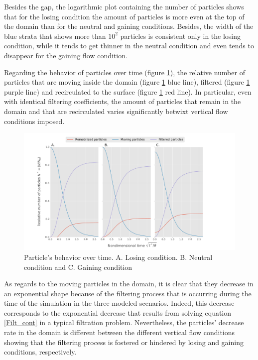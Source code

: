 \documentclass[draft,linenumbers]{agujournal2018}
\begin{document}
Besides the gap, the logarithmic plot containing the number of particles shows that for the losing condition the amount of particles is more even at the top of the domain than for the neutral and gaining conditions. Besides, the width of the blue strata that shows more than $10^2$ particles is consistent only in the losing condition, while it tends to get thinner in the neutral condition and even tends to disappear for the gaining flow condition.

Regarding the behavior of particles over time (figure \ref{Pvst}), the relative number of particles that are moving inside the domain (figure \ref{Pvst} blue line), filtered (figure \ref{Pvst} purple line) and recirculated to the surface (figure \ref{Pvst} red line). In particular, even with identical filtering coefficients, the amount of particles that remain in the domain and that are recirculated varies significantly betwixt vertical flow conditions imposed.

\begin{figure}
\centering
\includegraphics[trim=0.2cm 0.2cm 0.2cm 0.2cm, width=60pc]
{190131_Pvst.pdf}
\caption{Particle's behavior over time. A. Losing condition. B. Neutral condition and C. Gaining condition}
\label{Pvst}
\end{figure}

As regards to the moving particles in the domain, it is clear that they decrease in an exponential shape because of the filtering process that is occurring during the time of the simulation in the three modeled scenarios. Indeed, this decrease corresponds to the exponential decrease that results from solving equation \ref{Filt_cont} in a typical filtration problem. Nevertheless, the particles' decrease rate in the domain is different between the different vertical flow conditions showing that the filtering process is fostered or hindered by losing and gaining conditions, respectively. 
\end{document}
